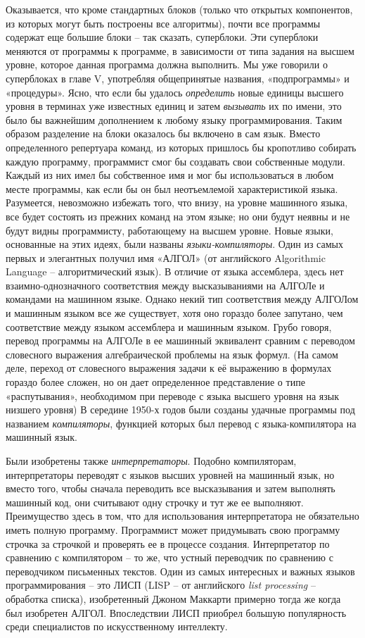 \documentclass[../main.tex]{subfiles}
\begin{document}
Оказывается, что кроме стандартных блоков (только что открытых компонентов, из которых могут быть построены все алгоритмы), почти все программы содержат еще большие блоки \--- так сказать, суперблоки. Эти суперблоки меняются от программы к программе, в зависимости от типа задания на высшем уровне, которое данная программа должна выполнить. Мы уже говорили о суперблоках в главе V, употребляя общепринятые названия, «подпрограммы» и «процедуры». Ясно, что если бы удалось \emph{определить} новые единицы высшего уровня в терминах уже известных единиц и затем \emph{вызывать} их по имени, это было бы важнейшим дополнением к любому языку программирования. Таким образом разделение на блоки оказалось бы включено в сам язык. Вместо определенного репертуара команд, из которых пришлось бы кропотливо собирать каждую программу, программист смог бы создавать свои собственные модули. Каждый из них имел бы собственное имя и мог бы использоваться в любом месте программы, как если бы он был неотъемлемой характеристикой языка. Разумеется, невозможно избежать того, что внизу, на уровне машинного языка, все будет состоять из прежних команд на этом языке; но они будут неявны и не будут видны программисту, работающему на высшем уровне. Новые языки, основанные на этих идеях, были названы \emph{языки-компиляторы}. Один из самых первых и элегантных получил имя «АЛГОЛ» (от английского Algorithmic Language \--- алгоритмический язык). В отличие от языка ассемблера, здесь нет взаимно-однозначного соответствия между высказываниями на АЛГОЛе и командами на машинном языке. Однако некий тип соответствия между АЛГОЛом и машинным языком все же существует, хотя оно гораздо более запутано, чем соответствие между языком ассемблера и машинным языком. Грубо говоря, перевод программы на АЛГОЛе в ее машинный эквивалент сравним с переводом словесного выражения алгебраической проблемы на язык формул. (На самом деле, переход от словесного выражения задачи к её выражению в формулах гораздо более сложен, но он дает определенное представление о типе «распутывания», необходимом при переводе с языка высшего уровня на язык низшего уровня) В середине 1950-х годов были созданы удачные программы под названием \emph{компиляторы}, функцией которых был перевод с языка-компилятора на машинный язык.

Были изобретены также \emph{интерпретаторы}. Подобно компиляторам, интерпретаторы переводят с языков высших уровней на машинный язык, но вместо того, чтобы сначала переводить все высказывания и затем выполнять машинный код, они считывают одну строчку и тут же ее выполняют. Преимущество здесь в том, что для использования интерпретатора не обязательно иметь полную программу. Программист может придумывать свою программу строчка за строчкой и проверять ее в процессе создания. Интерпретатор по сравнению с компилятором \--- то же, что устный переводчик по сравнению с переводчиком письменных текстов. Один из самых интересных и важных языков программирования \--- это ЛИСП (LISP \--- от английского \emph{list processing} \--- обработка списка), изобретенный Джоном Маккарти примерно тогда же когда был изобретен АЛГОЛ. Впоследствии ЛИСП приобрел большую популярность среди специалистов по искусственному интеллекту.
\end{document}
